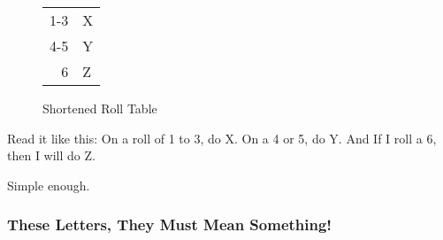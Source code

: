 \documentclass[a6paper,hidelinks]{article}
\begin{document}
\begin{figure}[h]
\caption{Shortened Roll Table}
\label{fig:shortened_roll_table}
\centering
\begin{tabular}{| r | l |}
\hline
1-3 & X \\
4-5 & Y \\
  6 & Z \\
\hline
\end{tabular}
\end{figure}

Read it like this: On a roll of 1 to 3, do X. On a 4 or 5, do Y. And If I roll a 6,
then I will do Z.

Simple enough.


\subsubsection{These Letters, They Must Mean Something!}
\end{document}
